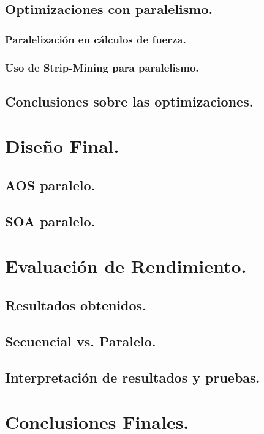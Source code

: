 \documentclass{article}
\begin{document}
\subsection{Optimizaciones con paralelismo.\label{opt_parallel}}

\subsubsection{Paralelización en cálculos de fuerza.}

\subsubsection{Uso de Strip-Mining para paralelismo.\label{strip-mining-parallel}}

\subsection{Conclusiones sobre las optimizaciones.}

\section{Diseño Final.\label{final}}
\subsection{AOS paralelo.}
\subsection{SOA paralelo.}

\section{Evaluación de Rendimiento.\label{performance}}
\subsection{Resultados obtenidos.}
\subsection{Secuencial vs. Paralelo.}
\subsection{Interpretación de resultados y pruebas.}

\section{Conclusiones Finales.\label{conclusiones}}
\end{document}
